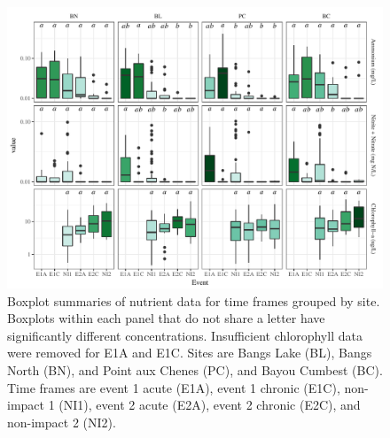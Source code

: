 \documentclass[letterpaper,12pt]{article}\usepackage[]{graphicx}\usepackage[]{color}
\makeatletter
\def\maxwidth{ %
  \ifdim\Gin@nat@width>\linewidth
    \linewidth
  \else
    \Gin@nat@width
  \fi
}
\makeatother
\begin{document}
\begin{figure}[!ht]

{\centering \includegraphics[width=\maxwidth]{figs/FigS1} 

}

\caption[Boxplot summaries of nutrient data for time frames grouped by site]{Boxplot summaries of nutrient data for time frames grouped by site. Boxplots within each panel that do not share a letter have significantly different concentrations. Insufficient chlorophyll data were removed for E1A and E1C. Sites are Bangs Lake (BL), Bangs North (BN), and Point aux Chenes (PC), and Bayou Cumbest (BC).  Time frames are event 1 acute (E1A), event 1 chronic (E1C), non-impact 1 (NI1), event 2 acute (E2A), event 2 chronic (E2C), and non-impact 2 (NI2).}\label{fig:FigS1}
\end{figure}


\clearpage
\end{document}
